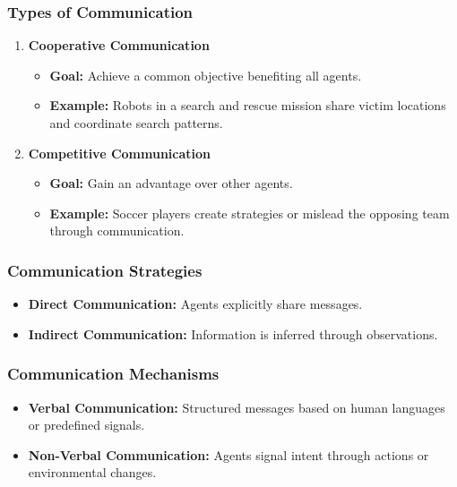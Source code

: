 \documentclass[aspectratio=169]{beamer}
\begin{document}
\begin{frame}[fragile]
  \frametitle{Types of Communication}
  \begin{enumerate}
    \item \textbf{Cooperative Communication}
      \begin{itemize}
        \item \textbf{Goal:} Achieve a common objective benefiting all agents.
        \item \textbf{Example:} Robots in a search and rescue mission share victim locations and coordinate search patterns.
      \end{itemize}
    
    \item \textbf{Competitive Communication}
      \begin{itemize}
        \item \textbf{Goal:} Gain an advantage over other agents.
        \item \textbf{Example:} Soccer players create strategies or mislead the opposing team through communication.
      \end{itemize}
  \end{enumerate}
\end{frame}

\begin{frame}[fragile]
  \frametitle{Communication Strategies}
  \begin{itemize}
    \item \textbf{Direct Communication:} Agents explicitly share messages.
    
    \item \textbf{Indirect Communication:} Information is inferred through observations.
  \end{itemize}
\end{frame}

\begin{frame}[fragile]
  \frametitle{Communication Mechanisms}
  \begin{itemize}
    \item \textbf{Verbal Communication:} Structured messages based on human languages or predefined signals.
    \item \textbf{Non-Verbal Communication:} Agents signal intent through actions or environmental changes.
  \end{itemize}
\end{frame}
\end{document}
